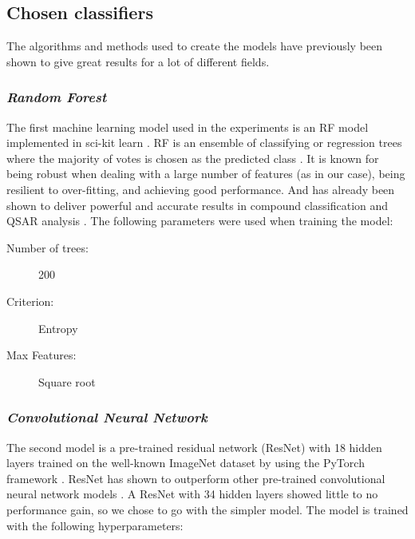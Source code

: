 \documentclass[a4paper,12pt,%
onecolumn,oneside,article,%
british%
]{memoir}
\renewcommand*{\|}[1][]{\nonscript\:#1\vert\nonscript\:\mathopen{}}
\begin{document}
\subsection{Chosen classifiers} 

The algorithms and methods used to create the models have previously been shown to give great results for a lot of different fields.

\subsubsection{\textit{Random Forest}}

The first machine learning model used in the experiments is an RF model implemented in sci-kit learn \autocites{pedregosaetal2011}. RF is an ensemble of classifying or regression trees where the majority of votes is chosen as the predicted class \autocites{breiman2001b}. It is known for being robust when dealing with a large number of features (as in our case), being resilient to over-fitting, and achieving good performance. And has already been shown to deliver powerful and accurate results in compound classification and QSAR analysis \autocites{svetniketal2003}. The following parameters were used when training the model: 

\medskip

\begin{framed}
  \begin{description}
  \item[Number of trees:] 200 
  \item[Criterion:] Entropy 
  \item[Max Features:] Square root
  \end{description}
\end{framed}

\subsubsection{\textit{Convolutional Neural Network}} 
The second model is a pre-trained residual network (ResNet) \autocites{heetal2016} with 18 hidden layers trained on the well-known ImageNet dataset  \autocites{russakovskyetal2015} by using the PyTorch framework \autocites{paszkeetal2019}. ResNet has shown to outperform other pre-trained convolutional neural network models \autocites{heetal2016}. A ResNet with 34 hidden layers showed little to no performance gain, so we chose to go with the simpler model. The model is trained with the following hyperparameters:
\medskip
\end{document}
